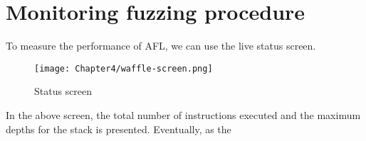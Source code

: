 \section{Monitoring fuzzing procedure}

To measure the performance of AFL, we can use the live status screen. 

\begin{figure}[H]
    \texttt{[image: Chapter4/waffle-screen.png]}
    \centering
    \label{img:waffle-screen}
    \caption{Status screen}
\end{figure}

In the above screen, the total number of instructions executed and the maximum depths for the stack is presented. Eventually, as the  